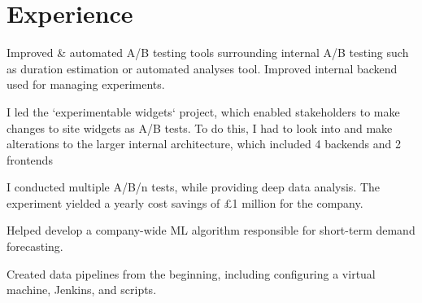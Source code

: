 \documentclass[]{CV}
\begin{document}
%
%


%
%

\begin{minipage}[t]{0.705\textwidth} 



\section{Experience}
\vspace{\topsep} %
\quad
\begin{tightemize}

\item Improved \& automated A/B testing tools surrounding internal A/B testing such as duration estimation or automated analyses tool. Improved internal backend used for managing experiments.

\item I led the `experimentable widgets` project, which enabled stakeholders to make changes to site widgets as A/B tests. To do this, I had to look into and make alterations to the larger internal architecture, which included 4 backends and 2 frontends

\item I conducted multiple A/B/n tests, while providing deep data analysis. The experiment yielded a yearly cost savings of £1 million for the company.

\item Helped develop a company-wide ML algorithm responsible for short-term demand forecasting.

\item Created data pipelines from the beginning, including configuring a virtual machine, Jenkins, and scripts.


\end{tightemize}
\end{minipage}
\end{document}
